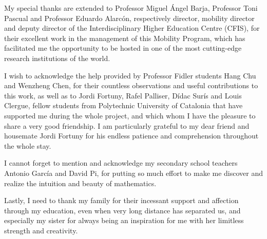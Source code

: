 My special thanks are extended to Professor Miguel Ángel Barja, Professor Toni
Pascual and Professor Eduardo Alarcón, respectively director, mobility director
and deputy director of the Interdisciplinary Higher Education Centre (CFIS), for
their excellent work in the management of this Mobility Program, which has
facilitated me the opportunity to be hosted in one of the most cutting-edge
research institutions of the world.

I wish to acknowledge the help provided by Professor Fidler students Hang Chu
and Wenzheng Chen, for their countless observations and useful contributions to
this work, as well as to Jordi Fortuny, Rafel Palliser, Dídac Surís and Louis
Clergue, fellow students from Polytechnic University of Catalonia that have
supported me during the whole project, and which whom I have the pleasure to
share a very good friendship. I am particularly grateful to my dear friend and
housemate Jordi Fortuny for his endless patience and comprehension throughout
the whole stay.

I cannot forget to mention and acknowledge my secondary school teachers Antonio
García and David Pi, for putting so much effort to make me discover and realize
the intuition and beauty of mathematics.

Lastly, I need to thank my family for their incessant support and affection
through my education, even when very long distance has separated us, and
especially my sister for always being an inspiration for me with her limitless
strength and creativity.


\tableofcontents
\listoftables
\listoffigures
